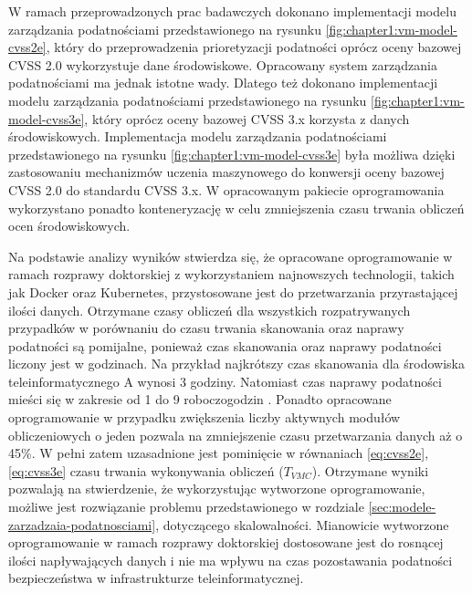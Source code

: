 W ramach przeprowadzonych prac badawczych dokonano implementacji modelu zarządzania podatnościami przedstawionego na rysunku \ref{fig:chapter1:vm-model-cvss2e}, który do przeprowadzenia prioretyzacji podatności oprócz oceny bazowej CVSS 2.0 wykorzystuje dane środowiskowe. Opracowany system zarządzania podatnościami ma jednak istotne wady. Dlatego też dokonano implementacji modelu zarządzania podatnościami przedstawionego na rysunku \ref{fig:chapter1:vm-model-cvss3e}, który oprócz oceny bazowej CVSS 3.x korzysta z danych środowiskowych. Implementacja modelu zarządzania podatnościami przedstawionego na rysunku \ref{fig:chapter1:vm-model-cvss3e} była możliwa dzięki zastosowaniu mechanizmów uczenia maszynowego  \cite{Nowak-cldd-2021, Nowa2109Conversion} do konwersji oceny bazowej CVSS 2.0 do standardu CVSS 3.x. W opracowanym pakiecie oprogramowania wykorzystano ponadto konteneryzację w celu zmniejszenia czasu trwania obliczeń ocen środowiskowych.

\bigbreak
Na podstawie analizy wyników stwierdza się, że opracowane oprogramowanie w ramach rozprawy doktorskiej z wykorzystaniem najnowszych technologii, takich jak Docker oraz Kubernetes, przystosowane jest do przetwarzania przyrastającej ilości danych. Otrzymane czasy obliczeń dla wszystkich rozpatrywanych przypadków w porównaniu do czasu trwania skanowania oraz naprawy podatności są pomijalne, ponieważ czas skanowania oraz naprawy podatności liczony jest w godzinach. Na przykład najkrótszy czas skanowania dla środowiska teleinformatycznego A wynosi 3 godziny. Natomiast czas naprawy podatności mieści się w zakresie od 1 do 9 roboczogodzin \cite{farris2018vulcon}. Ponadto opracowane oprogramowanie w przypadku zwiększenia liczby aktywnych modułów obliczeniowych o jeden pozwala na zmniejszenie czasu przetwarzania danych aż o 45\%. W pełni zatem uzasadnione jest pominięcie w równaniach \ref{eq:cvss2e}, \ref{eq:cvss3e} czasu trwania wykonywania obliczeń ($T_{VMC}$). Otrzymane wyniki pozwalają na stwierdzenie, że wykorzystując wytworzone oprogramowanie, możliwe jest rozwiązanie problemu przedstawionego w rozdziale \ref{sec:modele-zarzadzaia-podatnosciami}, dotyczącego skalowalności. Mianowicie wytworzone oprogramowanie w ramach rozprawy doktorskiej dostosowane jest do rosnącej ilości napływających danych i nie ma wpływu na czas pozostawania podatności bezpieczeństwa w infrastrukturze teleinformatycznej.

